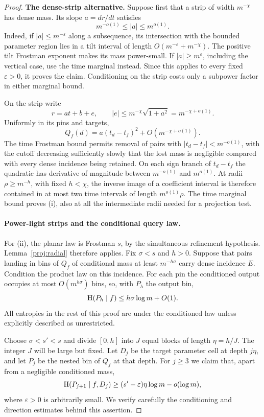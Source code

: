 \begin{proof}
\textbf{The dense-strip alternative.}
Suppose first that a strip of width $m^{-\chi}$ has dense mass.
Its slope $a=dr/dt$ satisfies
\[
 m^{-o(1)}\le |a|\le m^{o(1)}.
\]
Indeed, if $|a|\le m^{-\varepsilon}$ along a subsequence, its
intersection with the bounded parameter region lies in a tilt
interval of length $O(m^{-\varepsilon}+m^{-\chi})$. The positive
tilt Frostman exponent makes its mass power-small. If
$|a|\ge m^\varepsilon$, including the vertical case, use the time
marginal instead. Since this applies to every fixed
$\varepsilon>0$, it proves the claim. Conditioning on the strip
costs only a subpower factor in either marginal bound.

On the strip write
\[
 r=at+b+e,
 \qquad |e|\le m^{-\chi}\sqrt{1+a^2}=m^{-\chi+o(1)}.
\]
Uniformly in its pins and targets,
\[
 Q_f(d)=a(t_d-t_f)^2+O(m^{-\chi+o(1)}).
\]
The time Frostman bound permits removal of pairs with
$|t_d-t_f|<m^{-o(1)}$, with the cutoff decreasing sufficiently
slowly that the lost mass is negligible compared with every dense
incidence being retained. On each sign branch of $t_d-t_f$ the
quadratic has derivative of magnitude between $m^{-o(1)}$ and
$m^{o(1)}$. At radii $\rho\ge m^{-h}$, with fixed $h<\chi$,
the inverse image of a coefficient interval is therefore contained
in at most two time intervals of length $m^{o(1)}\rho$. The time
marginal bound proves (i), also at all the intermediate radii
needed for a projection test.

\paragraph{Power-light strips and the conditional query law.}
For (ii), the planar law is Frostman $s$, by the simultaneous
refinement hypothesis. Lemma~\ref{proj:radial} therefore applies.
Fix $\sigma<s$ and $h>0$. Suppose that pairs landing in bins of
$Q_f$ of conditional mass at least $m^{-h\sigma}$ carry dense
incidence $E$. Condition the product law on this incidence. For
each pin the conditioned output occupies at most
$O(m^{h\sigma})$ bins, so, with $P_h$ the output bin,
\begin{equation}
 \operatorname{H}(P_h\mid f)\le h\sigma\log m+O(1).
 \label{proj:product-upper}
\end{equation}
All entropies in the rest of this proof are under the conditioned
law unless explicitly described as unrestricted.

Choose $\sigma<s'<s$ and divide $[0,h]$ into $J$ equal blocks
of length $\eta=h/J$. The integer $J$ will be large but fixed.
Let $D_j$ be the target parameter cell at depth $j\eta$, and
let $P_j$ be the nested bin of $Q_f$ at that depth. For
$j\ge3$ we claim that, apart from a negligible conditioned mass,
\begin{equation}
 \operatorname{H}(P_{j+1}\mid f,D_j)
 \ge (s'-\varepsilon)\eta\log m-o(\log m),
 \label{proj:product-block}
\end{equation}
where $\varepsilon>0$ is arbitrarily small. We verify carefully
the conditioning and direction estimates behind this assertion.


\end{proof}
